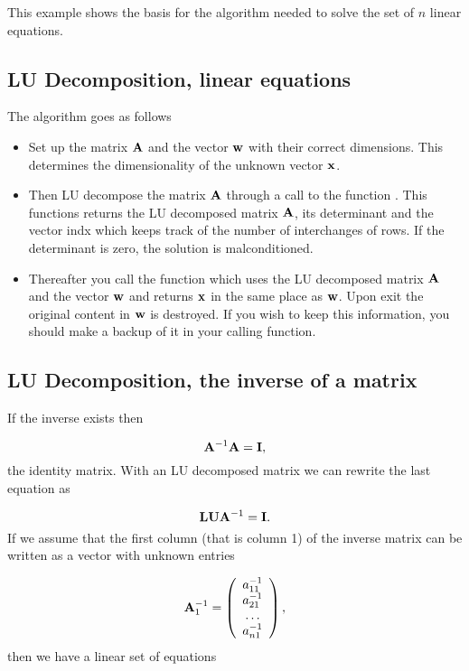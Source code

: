 \documentclass[%
twoside,                 %
final,                   %
10pt]{article}
\begin{document}
{{{{This example shows the basis for the algorithm
needed to solve the set of $n$ linear equations.

\subsection{LU Decomposition, linear equations}

The algorithm goes as follows

\begin{itemize}
  \item Set up the matrix $\bf A$ and the vector $\bf w$ with their correct dimensions. This determines the dimensionality of the unknown vector $\bf x$.

  \item Then LU decompose the matrix $\bf A$ through a call to the function . This functions returns the LU decomposed matrix $\bf A$, its determinant and the vector indx which keeps track of the number of interchanges of rows. If the determinant is zero, the solution is malconditioned.

  \item Thereafter you call the function   which uses the LU decomposed matrix $\bf A$ and the vector $\bf w$ and returns $\bf x$ in the same place as $\bf w$. Upon exit the original content in $\bf w$ is destroyed. If you wish to keep this information, you should make a backup of it in your calling function.
\end{itemize}

\noindent
\subsection{LU Decomposition, the inverse of a matrix}

If the inverse exists then

\[
   {\bf A}^{-1}{\bf A}={\bf I},
\]
the identity matrix. With an LU decomposed matrix we can rewrite the last equation as

\[
   {\bf LU}{\bf A}^{-1}={\bf I}.
\]
If we assume that the first column (that is column 1) of the inverse matrix
can be written as a vector with unknown entries

\[
    {\bf A}_1^{-1}= \left( \begin{array}{c}

                              a_{11}^{-1} \\
                              a_{21}^{-1} \\
                              \dots \\
                              a_{n1}^{-1} \\
                    \end{array} \right),
\]
then we have a linear set of equations

}}}}
\end{document}
